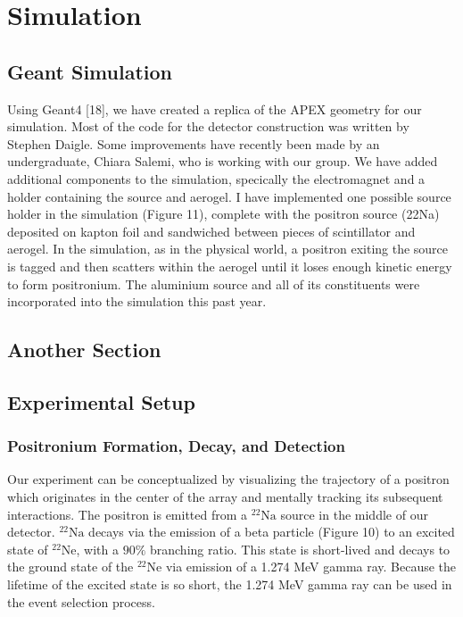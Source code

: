 \chapter{Simulation}
\section{Geant Simulation}

Using Geant4 [18], we have created a replica of the APEX geometry for our simulation. Most of the code
for the detector construction was written by Stephen Daigle. Some improvements have recently been made
by an undergraduate, Chiara Salemi, who is working with our group. We have added additional components
to the simulation, specically the electromagnet and a holder containing the source and aerogel. I have
implemented one possible source holder in the simulation (Figure 11), complete with the positron source
(22Na) deposited on kapton foil and sandwiched between pieces of scintillator and aerogel. In the simulation,
as in the physical world, a positron exiting the source is tagged and then scatters within the aerogel until
it loses enough kinetic energy to form positronium. The aluminium source and all of its constituents were
incorporated into the simulation this past year.


\section{Another Section}
\label{sec:mjd}
 \section{Experimental Setup}

\subsection{Positronium Formation, Decay, and Detection}

Our experiment can be conceptualized by visualizing the trajectory of a positron which originates in the center of the array and mentally tracking its subsequent interactions. The positron is emitted from a $\mathrm{{}^{22}Na}$ source in the middle of our detector. $\mathrm{{}^{22}Na}$ decays via the emission of a beta particle (Figure 10) to an excited state of $\mathrm{{}^{22}Ne}$, with a $90\%$ branching ratio. This state is short-lived and decays to the ground state of the $\mathrm{{}^{22}Ne}$ via emission of a 1.274 MeV gamma ray. Because the lifetime of the excited state is so short, the 1.274 MeV gamma ray can be used in the event selection process. 


